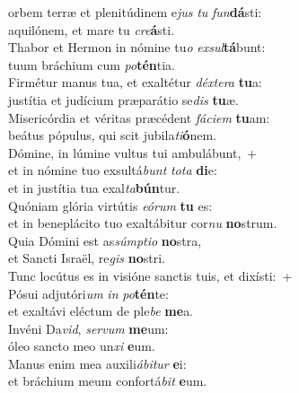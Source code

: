 \evenverse  orbem terræ et plenitúdinem e\textit{jus} \textit{tu} \textit{fun}\textbf{dá}sti:~\*\\
\evenverse aquilónem, et mare tu \textit{cre}\textbf{á}sti.\\
\oddverse Thabor et Hermon in nómine tu\textit{o} \textit{ex}\textit{sul}\textbf{tá}bunt:~\*\\
\oddverse tuum bráchium cum \textit{po}\textbf{tén}tia.\\
\evenverse Firmétur manus tua, et exaltétur \textit{déx}\textit{te}\textit{ra} \textbf{tu}a:~\*\\
\evenverse justítia et judícium præparátio se\textit{dis} \textbf{tu}æ.\\
\oddverse Misericórdia et véritas præcédent \textit{fá}\textit{ci}\textit{em} \textbf{tu}am:~\*\\
\oddverse beátus pópulus, qui scit jubila\textit{ti}\textbf{ó}nem.\\
\evenverse Dómine, in lúmine vultus tui ambulábunt,~+\\
\evenverse  et in nómine tuo exsultá\textit{bunt} \textit{to}\textit{ta} \textbf{di}e:~\*\\
\evenverse et in justítia tua exal\textit{ta}\textbf{bún}tur.\\
\oddverse Quóniam glória virtútis \textit{e}\textit{ó}\textit{rum} \textbf{tu} es:~\*\\
\oddverse et in beneplácito tuo exaltábitur cor\textit{nu} \textbf{no}strum.\\
\evenverse Quia Dómini est as\textit{súm}\textit{pti}\textit{o} \textbf{no}stra,~\*\\
\evenverse et Sancti Israël, re\textit{gis} \textbf{no}stri.\\
\oddverse Tunc locútus es in visióne sanctis tuis, et dixísti:~+\\
\oddverse  Pósui adjutóri\textit{um} \textit{in} \textit{po}\textbf{tén}te:~\*\\
\oddverse et exaltávi eléctum de ple\textit{be} \textbf{me}a.\\
\evenverse Invéni Da\textit{vid}, \textit{ser}\textit{vum} \textbf{me}um:~\*\\
\evenverse óleo sancto meo un\textit{xi} \textbf{e}um.\\
\oddverse Manus enim mea auxili\textit{á}\textit{bi}\textit{tur} \textbf{e}i:~\*\\
\oddverse et bráchium meum confortá\textit{bit} \textbf{e}um.\\
